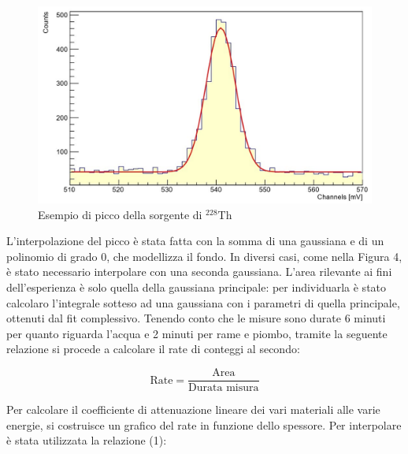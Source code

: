 \documentclass[a4paper,10pt]{article}
\begin{document}
\begin{figure}[!h]
    \centering
    \includegraphics[scale=0.6]{grafici/piccotorio}
    \caption{Esempio di picco della sorgente di ${}^{228}$Th}
\end{figure}

\newpage

\noindent L'interpolazione del picco \`e stata fatta con la somma di una gaussiana e di un polinomio di grado 0, che modellizza il fondo. In diversi casi, come nella Figura 4, \`e stato necessario interpolare con una seconda gaussiana. L'area rilevante ai fini dell'esperienza \`e solo quella della gaussiana principale: per individuarla \`e stato calcolaro l'integrale sotteso ad una gaussiana con i parametri di quella principale, ottenuti dal fit complessivo. Tenendo conto che le misure sono durate 6 minuti per quanto riguarda l'acqua e 2 minuti per rame e piombo, tramite la seguente relazione si procede a calcolare il rate di conteggi al secondo:

\begin{equation}
	\textrm{Rate} = \frac{\textrm{Area}}{\textrm{Durata  misura}}
\end{equation}

\noindent Per calcolare il coefficiente di attenuazione lineare dei vari materiali alle varie energie, si costruisce un grafico del rate in funzione dello spessore. Per interpolare \`e stata utilizzata la relazione (1):
\end{document}
